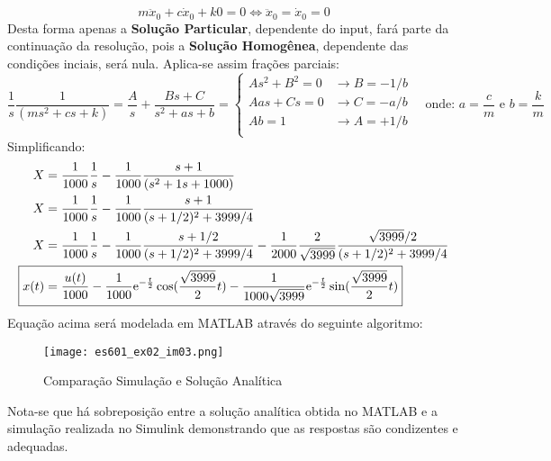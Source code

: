 \documentclass{article}
\begin{document}
\begin{resolution}
                    \begin{equation*}
                        m\ddot{x}_{0} + c\dot{x}_{0} + k0 = 0
                        \iff
                        \boxed{\ddot{x}_{0} = \dot{x}_{0} = 0}
                    \end{equation*}
                Desta forma apenas a \textbf{Solução Particular}, dependente do input, fará parte da continuação da resolução, pois a \textbf{Solução Homogênea}, dependente das condições inciais, será nula. Aplica-se assim frações parciais:
                    \begin{equation*}
                        \frac{1}{s}\frac{1}{(ms^2 + cs + k)} =
                        \frac{A}{s} + \frac{Bs + C}{s^2 + as + b} = 
                        \begin{cases}
                            As^2 + B^2 = 0  &\rightarrow\boxed{B = -1/b}\\
                            Aas + Cs = 0    &\rightarrow\boxed{C = -a/b}\\
                            Ab = 1          &\rightarrow\boxed{A = +1/b}\\
                        \end{cases}
                        \quad
                        \text{onde: $a = \frac{c}{m}$ e $b = \frac{k}{m}$}
                    \end{equation*}
                Simplificando:
                    \begin{align}
                        X &= \frac{1}{1000}\frac{1}{s} - \frac{1}{1000}\frac{s+1}{(s^2 + 1s + 1000)}\nonumber\\
                        X &= \frac{1}{1000}\frac{1}{s} - \frac{1}{1000}\frac{s+1}{(s + 1/2)^2 + 3999/4}\nonumber\\
                        X &= \frac{1}{1000}\frac{1}{s} - \frac{1}{1000}\frac{s+1/2}{(s + 1/2)^2 + 3999/4} - \frac{1}{2000}\frac{2}{\sqrt{3999}}\frac{\sqrt{3999}/2}{(s + 1/2)^2 + 3999/4}\\
                        \Aboxed{x(t) &= \frac{u(t)}{1000} - \frac{1}{1000}\text{e}^{-\frac{t}{2}}\cos(\frac{\sqrt{3999}}{2}t) - \frac{1}{1000\sqrt{3999}}\text{e}^{-\frac{t}{2}}\sin(\frac{\sqrt{3999}}{2}t)}
                    \end{align}
                Equação acima será modelada em MATLAB através do seguinte algoritmo:
                    \begin{scriptsize}
                        \myOctave
                        
                    \end{scriptsize}
                    \begin{figure}[H]
                        \centering
                        \texttt{[image: es601\_ex02\_im03.png]}
                        \caption{Comparação Simulação e Solução Analítica}
                    \end{figure}
                Nota-se que há sobreposição entre a solução analítica obtida no MATLAB e a simulação realizada no Simulink demonstrando que as respostas são condizentes e adequadas.
            \end{resolution}
\end{document}
